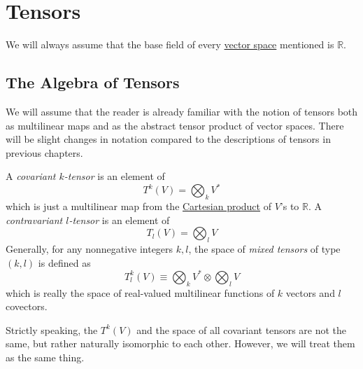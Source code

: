\documentclass{article}
\newcounter{definition}[section]
\begin{document}
\section{Tensors}

  We will always assume that the base field of every \hyperref[lin-def:vector-space]{vector space} mentioned is $\mathbb{R}$. 

  \subsection{The Algebra of Tensors}

    We will assume that the reader is already familiar with the notion of tensors both as multilinear maps and as the abstract tensor product of vector spaces. There will be slight changes in notation compared to the descriptions of tensors in previous chapters. 

    \begin{definition}
      \label{def:covariant-k-tensor}
    A \textit{covariant $k$-tensor} is an element of 
    \begin{equation}
      T^k (V) = \bigotimes_k V^*
    \end{equation}
    which is just a multilinear map from the \hyperref[st-def:cart-prod-2]{Cartesian product} of $V$'s to $\mathbb{R}$. A \textit{contravariant $l$-tensor} is an element of 
    \begin{equation}
      T_l (V) = \bigotimes_l V
    \end{equation}
    Generally, for any nonnegative integers $k, l$, the space of \textit{mixed tensors} of type $(k, l)$ is defined as 
    \begin{equation}
      T^k_l (V) \equiv \bigotimes_k V^* \otimes \bigotimes_l V
    \end{equation}
    which is really the space of real-valued multilinear functions of $k$ vectors and $l$ covectors. 
    \end{definition}

    Strictly speaking, the $T^k (V)$ and the space of all covariant tensors are not the same, but rather naturally isomorphic to each other. However, we will treat them as the same thing. 
\end{document}

